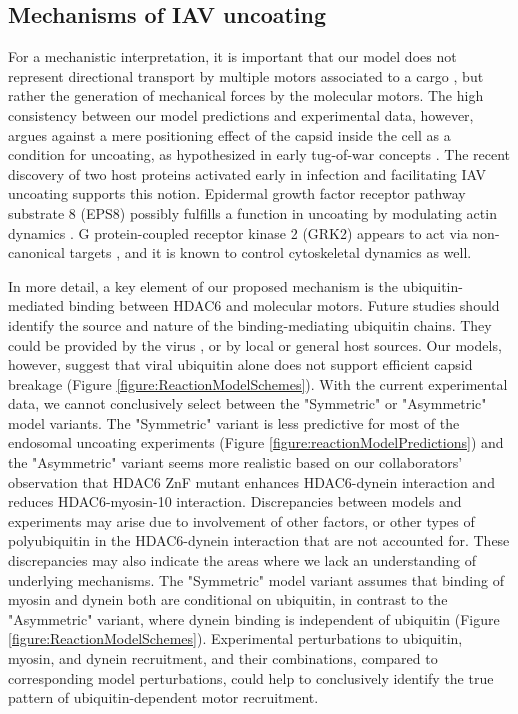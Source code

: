 \subsection{Mechanisms of IAV uncoating}

For a mechanistic interpretation, it is important that our model does not represent directional transport by multiple motors associated to a cargo \cite{hancock2014bidirectional}, but rather the generation of mechanical forces by the molecular motors. The high consistency between our model predictions and experimental data, however, argues against a mere positioning effect of the capsid inside the cell as a condition for uncoating, as hypothesized in early tug-of-war concepts \cite{lukic2014hiv, radtke2010plus}. The recent discovery of two host proteins activated early in infection and facilitating IAV uncoating supports this notion. Epidermal growth factor receptor pathway substrate 8 (EPS8) possibly fulfills a function in uncoating by modulating actin dynamics \cite{larson2019eps8}. G protein-coupled receptor kinase 2 (GRK2) appears to act via non-canonical targets \cite{yanguez2018phosphoproteomic}, and it is known to control cytoskeletal dynamics as well.

In more detail, a key element of our proposed mechanism is the ubiquitin-mediated binding between HDAC6 and molecular motors. Future studies should identify the source and nature of the binding-mediating ubiquitin chains. They could be provided by the virus \cite{banerjee2014influenza}, or by local or general host sources. Our models, however, suggest that viral ubiquitin alone does not support efficient capsid breakage (Figure \ref{figure:ReactionModelSchemes}). With the current experimental data, we cannot conclusively select between the "Symmetric" or "Asymmetric" model variants. The "Symmetric" variant is less predictive for most of the endosomal uncoating experiments (Figure \ref{figure:reactionModelPredictions}) and the "Asymmetric" variant seems more realistic based on our collaborators' observation that HDAC6 ZnF mutant enhances HDAC6-dynein interaction and reduces HDAC6-myosin-10 interaction. Discrepancies between models and experiments may arise due to involvement of other factors, or other types of polyubiquitin in the HDAC6-dynein interaction that are not accounted for. These discrepancies may also indicate the areas where we lack an understanding of underlying mechanisms. The "Symmetric" model variant assumes that binding of myosin and dynein both are conditional on ubiquitin, in contrast to the "Asymmetric" variant, where dynein binding is independent of ubiquitin (Figure \ref{figure:ReactionModelSchemes}). Experimental perturbations to ubiquitin, myosin, and dynein recruitment, and their combinations, compared to corresponding model perturbations, could help to conclusively identify the true pattern of ubiquitin-dependent motor recruitment.

